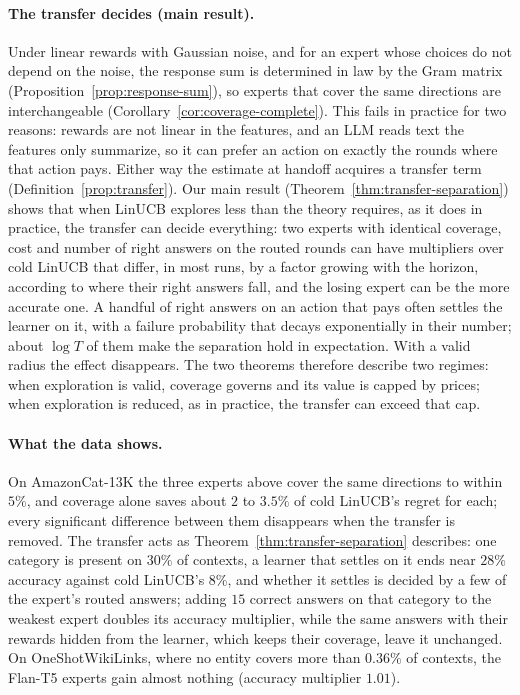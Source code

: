 \documentclass[anon]{alt2027} %
\begin{document}
\paragraph{The transfer decides (main result).}
Under linear rewards with Gaussian noise, and for an expert whose choices do
not depend on the noise, the response sum is determined in law by the Gram
matrix (Proposition~\ref{prop:response-sum}), so experts that cover the same
directions are interchangeable (Corollary~\ref{cor:coverage-complete}). This
fails in practice for two reasons: rewards are not linear in the features,
and an LLM reads text the features only summarize, so it can prefer an action
on exactly the rounds where that action pays. Either way the estimate at
handoff acquires a transfer term (Definition~\ref{prop:transfer}). Our main
result (Theorem~\ref{thm:transfer-separation}) shows that when LinUCB explores
less than the theory requires, as it does in practice, the transfer can
decide everything: two experts with identical coverage, cost and number of
right answers on the routed rounds can have multipliers over cold LinUCB that
differ, in most runs, by a factor growing with the horizon, according to
where their right answers fall, and the losing expert can be the more
accurate one. A handful of right answers on an action that pays often settles
the learner on it, with a failure probability that decays exponentially in
their number; about $\log T$ of them make the separation hold in expectation.
With a valid radius the effect disappears. The two theorems therefore
describe two regimes: when exploration is valid, coverage governs and its
value is capped by prices; when exploration is reduced, as in practice, the
transfer can exceed that cap.

\paragraph{What the data shows.}
On AmazonCat-13K the three experts above cover the same directions to within
$5\%$, and coverage alone saves about $2$ to $3.5\%$ of cold LinUCB's regret
for each; every significant difference between them disappears when the
transfer is removed. The transfer acts as Theorem~\ref{thm:transfer-separation}
describes: one category is present on $30\%$ of contexts, a learner that
settles on it ends near $28\%$ accuracy against cold LinUCB's $8\%$, and
whether it settles is decided by a few of the expert's routed answers; adding
$15$ correct answers on that category to the weakest expert doubles its
accuracy multiplier, while the same answers with their rewards hidden from the
learner, which keeps their coverage, leave it unchanged. On OneShotWikiLinks, where no entity covers more than
$0.36\%$ of contexts, the Flan-T5 experts gain almost nothing (accuracy
multiplier $1.01$).
\end{document}
